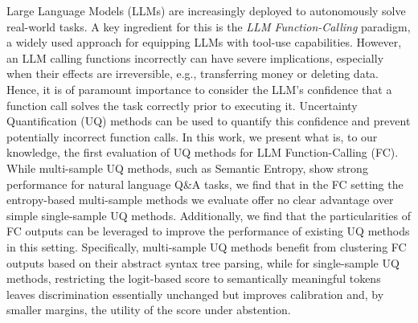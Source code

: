


Large Language Models (LLMs) are increasingly deployed to autonomously solve real-world tasks. 
A key ingredient for this is the \emph{LLM Function-Calling} paradigm, a widely used approach for equipping LLMs with tool-use capabilities.
However, an LLM calling functions incorrectly can have severe implications, especially when their effects are irreversible, e.g., transferring money or deleting data.
Hence, it is of paramount importance to consider the LLM's confidence that a function call solves the task correctly prior to executing it.
Uncertainty Quantification (UQ) methods can be used to quantify this confidence and prevent potentially incorrect function calls.
In this work, we present what is, to our knowledge, the first evaluation of UQ methods for LLM Function-Calling (FC).
While multi-sample UQ methods, such as Semantic Entropy, show strong performance for natural language Q\&A tasks, we find that in the FC setting the entropy-based multi-sample methods we evaluate offer no clear advantage over simple single-sample UQ methods.
Additionally, we find that the particularities of FC outputs can be leveraged to improve the performance of existing UQ methods in this setting.
Specifically, multi-sample UQ methods benefit from clustering FC outputs based on their abstract syntax tree parsing, while for single-sample UQ methods, restricting the logit-based score to semantically meaningful tokens leaves discrimination essentially unchanged but improves calibration and, by smaller margins, the utility of the score under abstention.

